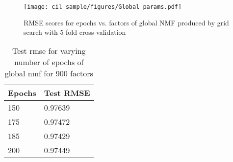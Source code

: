 \documentclass[10pt,conference,compsocconf]{IEEEtran}
\begin{document}
\begin{figure}[h]
  \centering
  \texttt{[image: cil\_sample/figures/Global\_params.pdf]}
  \caption{RMSE scores for epochs vs. factors of global NMF produced by grid search with 5 fold cross-validation}
  \label{fig:gridsearchglobal}
\end{figure}


\begin{table}[h]
\centering
\begin{tabular}{|l|l|}
\hline
Epochs & Test RMSE \\ \hline
150     & 0.97639   \\ \hline
175     & 0.97472   \\ \hline
185     & 0.97429   \\ \hline
200     & 0.97449   \\ \hline
\end{tabular}\caption{Test rmse for varying number of epochs of global nmf for 900 factors}\label{table:testrmse-global-epochs}
\end{table}


\end{document}
